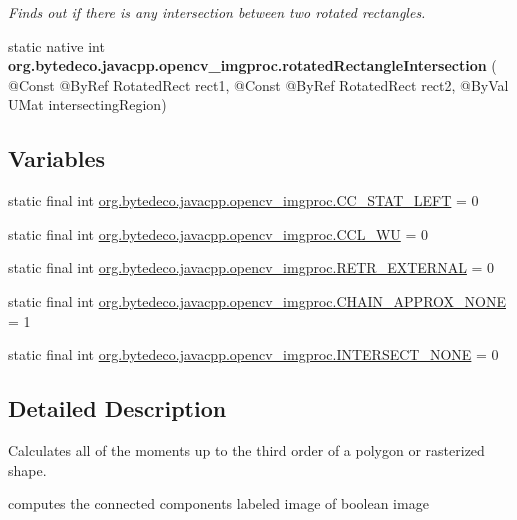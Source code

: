 \begin{DoxyCompactItemize}
\begin{DoxyCompactList}\small\item\em Finds out if there is any intersection between two rotated rectangles. \end{DoxyCompactList}\item 
\mbox{\label{group__imgproc__shape_ga3b6f1be65a6265484440e694bcf84f90}} 
static native int {\bfseries org.\+bytedeco.\+javacpp.\+opencv\+\_\+imgproc.\+rotated\+Rectangle\+Intersection} ( @Const @By\+Ref Rotated\+Rect rect1, @Const @By\+Ref Rotated\+Rect rect2, @By\+Val U\+Mat intersecting\+Region)
\end{DoxyCompactItemize}
\subsection*{Variables}
\begin{DoxyCompactItemize}
\item 
static final int \hyperlink{group__imgproc__shape_ga349952fcbf280ca92c36978312c607a6}{org.\+bytedeco.\+javacpp.\+opencv\+\_\+imgproc.\+C\+C\+\_\+\+S\+T\+A\+T\+\_\+\+L\+E\+FT} = 0
\item 
static final int \hyperlink{group__imgproc__shape_ga9b0d3771ada15612aef51a25db60c21f}{org.\+bytedeco.\+javacpp.\+opencv\+\_\+imgproc.\+C\+C\+L\+\_\+\+WU} = 0
\item 
static final int \hyperlink{group__imgproc__shape_ga94d7307a24949485303f94d555fd31c8}{org.\+bytedeco.\+javacpp.\+opencv\+\_\+imgproc.\+R\+E\+T\+R\+\_\+\+E\+X\+T\+E\+R\+N\+AL} = 0
\item 
static final int \hyperlink{group__imgproc__shape_ga2e9681fae693a35abe17e8f4265acdbf}{org.\+bytedeco.\+javacpp.\+opencv\+\_\+imgproc.\+C\+H\+A\+I\+N\+\_\+\+A\+P\+P\+R\+O\+X\+\_\+\+N\+O\+NE} = 1
\item 
static final int \hyperlink{group__imgproc__shape_gae1ca9924d0a73e52ad45f660cc2160e4}{org.\+bytedeco.\+javacpp.\+opencv\+\_\+imgproc.\+I\+N\+T\+E\+R\+S\+E\+C\+T\+\_\+\+N\+O\+NE} = 0
\end{DoxyCompactItemize}


\subsection{Detailed Description}
Calculates all of the moments up to the third order of a polygon or rasterized shape. 

computes the connected components labeled image of boolean image

